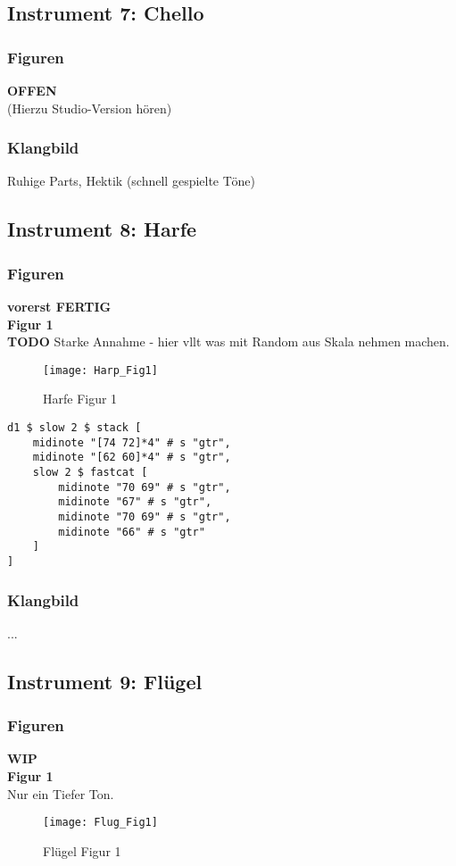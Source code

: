 \documentclass[
10pt, %
a4paper, %
oneside, %
headinclude,footinclude, %
BCOR5mm, %
]{scrartcl}
\begin{document}
\subsection{Instrument 7: Chello}
\subsubsection{Figuren}
{\color{red}\textbf{OFFEN}} \\
(Hierzu Studio-Version hören)\\

\subsubsection{Klangbild}
Ruhige Parts, Hektik (schnell gespielte Töne)


\subsection{Instrument 8: Harfe}
\subsubsection{Figuren}
{\color{green}\textbf{vorerst FERTIG}} \\
\noindent\textbf{Figur 1}\\
{\color{red}\textbf{TODO}} Starke Annahme - hier vllt was mit Random aus Skala nehmen machen.
\begin{figure}[h]
	\centering 
	\texttt{[image: Harp\_Fig1]} 
	\caption{Harfe Figur 1}
\end{figure}

\begin{lstlisting}
d1 $ slow 2 $ stack [
	midinote "[74 72]*4" # s "gtr", 
	midinote "[62 60]*4" # s "gtr", 
	slow 2 $ fastcat [
		midinote "70 69" # s "gtr", 
		midinote "67" # s "gtr",
		midinote "70 69" # s "gtr", 
		midinote "66" # s "gtr"    
	]
]
\end{lstlisting}



\subsubsection{Klangbild}
...

\subsection{Instrument 9: Flügel}
\subsubsection{Figuren}
{\color{orange}\textbf{WIP}} \\
\noindent\textbf{Figur 1}\\
Nur ein Tiefer Ton.
\begin{figure}[h]
	\centering 
	\texttt{[image: Flug\_Fig1]} 
	\caption{Flügel Figur 1}
\end{figure}
\end{document}
